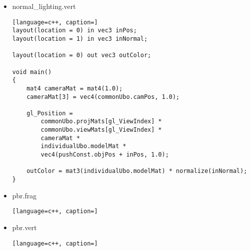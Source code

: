 \begin{itemize}
\begin{lstlisting}[language=c++, caption=]
void main()
{
    outColor = vec4(inColor, 1.0);
}
\end{lstlisting}
    \item normal\_lighting.vert
\begin{lstlisting}[language=c++, caption=]
layout(location = 0) in vec3 inPos;
layout(location = 1) in vec3 inNormal;

layout(location = 0) out vec3 outColor;

void main()
{
    mat4 cameraMat = mat4(1.0);
    cameraMat[3] = vec4(commonUbo.camPos, 1.0);

    gl_Position =
        commonUbo.projMats[gl_ViewIndex] *
        commonUbo.viewMats[gl_ViewIndex] *
        cameraMat *
        individualUbo.modelMat *
        vec4(pushConst.objPos + inPos, 1.0);

    outColor = mat3(individualUbo.modelMat) * normalize(inNormal);
}
\end{lstlisting}
    \item pbr.frag
\begin{lstlisting}[language=c++, caption=]
\end{lstlisting}
    \item pbr.vert
\begin{lstlisting}[language=c++, caption=]
\end{lstlisting}
\end{itemize}